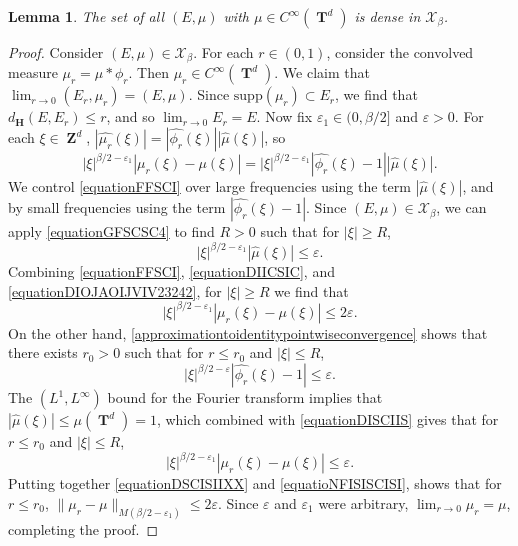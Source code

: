 \documentclass[12pt,reqno]{article}
\numberwithin{equation}{section}
\DeclareMathOperator{\ZZ}{\mathbf{Z}}
\DeclareMathOperator{\TT}{\mathbf{T}}
\newtheorem{lemma}[theorem]{Lemma}
\numberwithin{theorem}{section}
\begin{document}
\begin{lemma} \label{smoothdensitylemma}
    The set of all $(E,\mu)$ with $\mu \in C^\infty(\TT^d)$ is dense in $\mathcal{X}_\beta$.
\end{lemma}
\begin{proof}
    Consider $(E,\mu) \in \mathcal{X}_\beta$. For each $r \in (0,1)$, consider the convolved measure $\mu_r = \mu * \phi_r$. Then $\mu_r \in C^\infty(\TT^d)$. We claim that $\lim_{r \to 0} (E_r,\mu_r) = (E,\mu)$. Since $\text{supp}(\mu_r) \subset E_r$, we find that $d_{\mathbf{H}}(E,E_r) \leq r$, and so $\lim_{r \to 0} E_r = E$. Now fix $\varepsilon_1 \in (0,\beta/2]$ and $\varepsilon > 0$. For each $\xi \in \ZZ^d$, $|\widehat{\mu_r}(\xi)| = |\widehat{\phi_r}(\xi)| |\widehat{\mu}(\xi)|$, so
    \begin{equation} \label{equationFFSCI}
        |\xi|^{\beta/2 - \varepsilon_1} |\mu_r(\xi) - \mu(\xi)| = |\xi|^{\beta/2 - \varepsilon_1} |\widehat{\phi_r}(\xi) - 1| |\widehat{\mu}(\xi)|.
    \end{equation}
    We control \eqref{equationFFSCI} over large frequencies using the term $|\widehat{\mu}(\xi)|$, and by small frequencies using the term $|\widehat{\phi_r}(\xi) - 1|$. Since $(E,\mu) \in \mathcal{X}_\beta$, we can apply \eqref{equationGFSCSC4} to find $R > 0$ such that for $|\xi| \geq R$,
    \begin{equation} \label{equationDIICSIC}
        |\xi|^{\beta/2 - \varepsilon_1} |\widehat{\mu}(\xi)| \leq \varepsilon.
    \end{equation}
    Combining \eqref{equationFFSCI}, \eqref{equationDIICSIC}, and \eqref{equationDIOJAOIJVIV23242}, for $|\xi| \geq R$ we find that
    \begin{equation} \label{equationDSCISIIXX}
        |\xi|^{\beta/2 - \varepsilon_1} |\mu_r(\xi) - \mu(\xi)| \leq 2 \varepsilon.
    \end{equation}
    On the other hand, \eqref{approximationtoidentitypointwiseconvergence} shows that there exists $r_0 > 0$ such that for $r \leq r_0$ and $|\xi| \leq R$,
    \begin{equation} \label{equationDISCIIS}
        |\xi|^{\beta/2 - \varepsilon} |\widehat{\phi_r}(\xi) - 1| \leq \varepsilon.
    \end{equation}
    The $(L^1,L^\infty)$ bound for the Fourier transform implies that $|\widehat{\mu}(\xi)| \leq \mu(\TT^d) = 1$, which combined with \eqref{equationDISCIIS} gives that for $r \leq r_0$ and $|\xi| \leq R$,
    \begin{equation} \label{equatioNFISISCISI}
        |\xi|^{\beta/2 - \varepsilon_1} |\mu_r(\xi) - \mu(\xi)| \leq \varepsilon.
    \end{equation}
    Putting together \eqref{equationDSCISIIXX} and \eqref{equatioNFISISCISI}, shows that for $r \leq r_0$, $\| \mu_r - \mu \|_{M(\beta/2 - \varepsilon_1)} \leq 2\varepsilon$. Since $\varepsilon$ and $\varepsilon_1$ were arbitrary, $\lim_{r \to 0} \mu_r = \mu$, completing the proof.
\end{proof}
\end{document}
